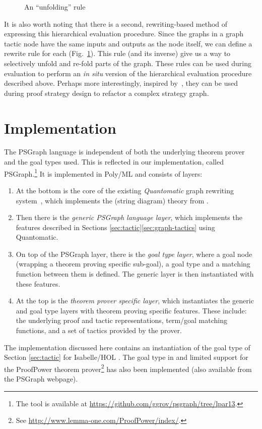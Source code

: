 \documentclass{llncs}
\begin{document}
\begin{figure}\centering
  \vspace{-12pt}
  \vspace{-2pt}
  \caption{An ``unfolding'' rule}\label{fig:unfold-or}
  \vspace{-14pt}
\end{figure}

It is also worth noting that there is a second, rewriting-based method of expressing this hierarchical evaluation procedure. Since the graphs  in a graph tactic node have the same inputs and outputs as the node itself, we can define a rewrite rule for each  (Fig.~\ref{fig:unfold-or}). This rule (and its inverse) give us a way to selectively unfold and re-fold parts of the graph. These rules can be used during evaluation to perform an \textit{in situ} version of the hierarchical evaluation procedure described above. Perhaps more interestingly, inspired by~\cite{paper:Whiteside:11}, they can be used during proof strategy design to refactor a complex strategy graph.


\beforesection
\section{Implementation}\label{sec:impl}
\aftersection

\newcommand{\psgraphtool}{\textsf{PSGraph}}

The PSGraph language is independent of both the underlying theorem prover and the goal types used. This is reflected in  our implementation, called \psgraphtool{}.\footnote{The tool is available at \url{https://github.com/ggrov/psgraph/tree/lpar13}.} It is implemented in
Poly/ML and consists of  layers:
\begin{enumerate}
\item At the bottom is the core of the existing \emph{Quantomatic} graph rewriting system~\cite{Quantomatic}, which implements the (string diagram) theory from \cite{paper:Dixon:10}.
\item Then there is the \emph{generic PSGraph language layer}, which implements the features
described in Sections \ref{sec:tactic}\ref{sec:graph-tactics} using Quantomatic.
\item On top of the PSGraph layer, there is the \emph{goal type layer}, where a goal node (wrapping a theorem proving specific sub-goal), a goal type and a matching function between them is defined. The generic layer is then instantiated with these features.
\item At the top is the \emph{theorem prover specific layer}, which instantiates the generic and goal type layers with theorem proving specific features. These include: the underlying proof and tactic representations, term/goal matching functions, and a set of tactics provided by the prover.
\end{enumerate}
The implementation discussed here contains an instantiation of the goal type  of Section \ref{sec:tactic} for Isabelle/HOL \cite{paper:Paulson:90}. The goal type in \cite{grov13a} and limited support for
the ProofPower theorem prover\footnote{See \url{http://www.lemma-one.com/ProofPower/index/}.} has also been implemented (also available from the \psgraphtool{} webpage).
\end{document}
